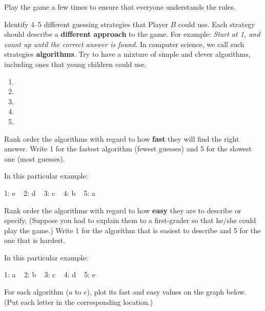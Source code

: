 \Q Play the game a few times to ensure that everyone understands the rules.

\vspace{1ex}


\Q Identify 4--5 different guessing strategies that Player $B$ could use.
Each strategy should describe a \textbf{different approach} to the game.
For example: \textit{Start at 1, and count up until the correct answer is found.}
In computer science, we call such strategies \textbf{algorithms}.
Try to have a mixture of simple and clever algorithms, including ones that young children could use.

\begin{enumerate}
\item {}
\item {}
\item {}
\item {}
\item {}
\end{enumerate}


\Q Rank order the algorithms with regard to how \textbf{fast} they will find the right answer.
Write 1 for the fastest algorithm (fewest guesses) and 5 for the slowest one (most guesses).

\begin{answer}
In this particular example:

1: e ~ 2: d ~ 3: c ~ 4: b ~ 5: a
\end{answer}


\Q Rank order the algorithms with regard to how \textbf{easy} they are to describe or specify.
(Suppose you had to explain them to a first-grader so that he/she could play the game.)
Write 1 for the algorithm that is easiest to describe and 5 for the one that is hardest.

\begin{answer}
In this particular example:

1: a ~ 2: b ~ 3: c ~ 4: d ~ 5: e
\end{answer}


\Q For each algorithm ($a$ to $e$), plot its fast and easy values on the graph below. (Put each letter in the corresponding location.)

